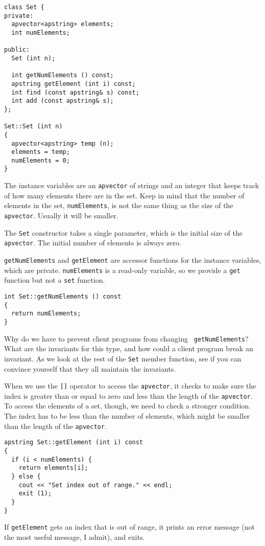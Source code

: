\begin{verbatim}
class Set {
private:
  apvector<apstring> elements;
  int numElements;

public:
  Set (int n);

  int getNumElements () const;
  apstring getElement (int i) const;
  int find (const apstring& s) const;
  int add (const apstring& s);
};

Set::Set (int n)
{
  apvector<apstring> temp (n);
  elements = temp;
  numElements = 0;
}
\end{verbatim}
%
The instance variables are an {\tt apvector} of strings and an
integer that keeps track of how many elements there are in the
set.  Keep in mind that the number of elements in the
set, {\tt numElements}, is not the same thing as the size
of the {\tt apvector}.  Usually it will be smaller.


The {\tt Set} constructor takes a single parameter, which is
the initial size of the {\tt apvector}.  The initial number
of elements is always zero.

{\tt getNumElements} and {\tt getElement} are accessor functions
for the instance variables, which are private.  {\tt numElements}
is a read-only variable, so we provide a {\tt get} function
but not a {\tt set} function.

\begin{verbatim}
int Set::getNumElements () const
{
  return numElements;
}
\end{verbatim}
%
Why do we have to prevent client programs from changing {\tt
getNumElements}?  What are the invariants for this type, and
how could a client program break an invariant.  As we look
at the rest of the {\tt Set} member function, see if you can
convince yourself that they all maintain the invariants.


When we use the {\tt []} operator to access the {\tt apvector},
it checks to make sure the index is greater than or equal to zero
and less than the length of the {\tt apvector}.  To access the
elements of a set, though, we need to check a stronger condition.
The index has to be less than the number of elements, which 
might be smaller than the length of the {\tt apvector}.

\begin{verbatim}
apstring Set::getElement (int i) const
{
  if (i < numElements) {
    return elements[i];
  } else {
    cout << "Set index out of range." << endl;
    exit (1);
  }
}
\end{verbatim}
%
If {\tt getElement} gets an index that is out of range, it prints
an error message (not the most useful message, I admit), and
exits.

